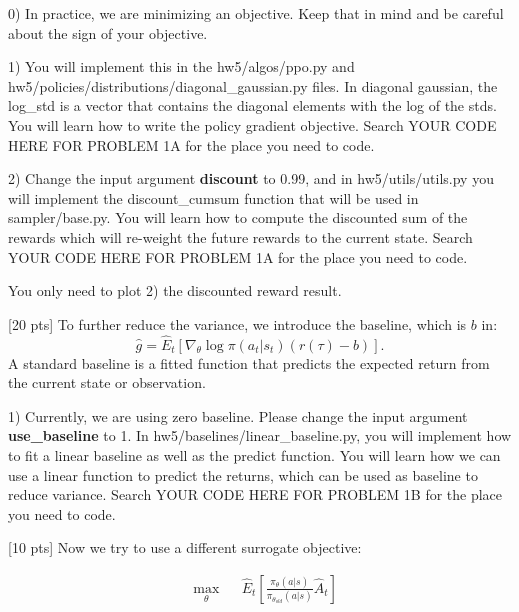\documentclass{article}
\begin{document}
0) In practice, we are minimizing an objective. Keep that in mind and be careful about the sign of your objective.

1) You will implement this in the hw5/algos/ppo.py and hw5/policies/distributions/diagonal\_gaussian.py files. In diagonal gaussian, the log\_std is a vector that contains the diagonal elements with the log of the stds. You will learn how to write the policy gradient objective.
 Search YOUR CODE HERE FOR PROBLEM 1A for the place you need to code.  

2) Change the input argument {\bf discount} to 0.99, and in hw5/utils/utils.py you will implement the discount\_cumsum function that will be used in sampler/base.py. You will learn how to compute the discounted sum of the rewards which will re-weight the future rewards to the current state. Search YOUR CODE HERE FOR PROBLEM 1A for the place you need to code. 

You only need to plot 2) the discounted reward result.







\vskip 0.5in

 [20 pts]
 To further reduce the variance, we introduce the baseline, which is $b$ in:
 $$\hat{g} = \hat{E}_t[\nabla_\theta \log \pi(a_t | s_t)(r(\tau)-b)]. $$ A standard baseline is a fitted function that predicts the expected return from the current state or observation.
 
 
 1) Currently, we are using zero baseline. Please change the input argument {\bf use\_baseline} to 1. In hw5/baselines/linear\_baseline.py, you will implement how to fit a linear baseline as well as the predict function. You will learn how we can use a linear function to predict the returns, which can be used as baseline to reduce variance. Search YOUR CODE HERE FOR PROBLEM 1B for the place you need to code.
 
 \vskip 0.5in
 
  [10 pts] Now we try to use a different surrogate objective:

 \begin{equation}
\begin{aligned}
& \underset{\theta}{\text{max}}
& & \hat{E}_t[\frac{\pi_\theta(a|s)}{\pi_{\theta_{old}}(a|s)}\hat{A}_t] \\
\end{aligned}
\end{equation}
\end{document}
